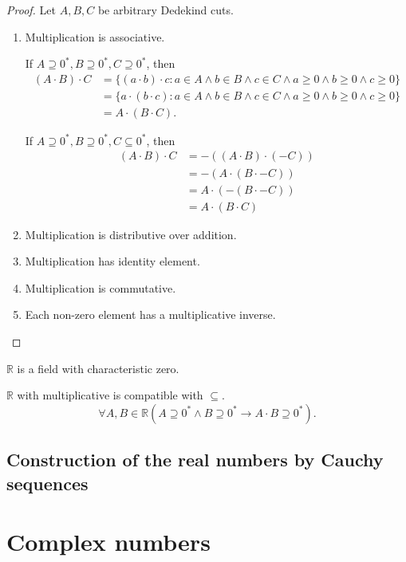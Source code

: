 \begin{proof}
    \par Let $A, B, C$ be arbitrary Dedekind cuts.
    \begin{enumerate}[label={(F\arabic*)}, start=4]
        \item Multiplication is associative.
              \par If $A\supseteq {0}^{*}, B\supseteq {0}^{*}, C\supseteq {0}^{*}$, then
              \begin{align*}
                  (A\cdot B)\cdot C & = \{ (a\cdot b)\cdot c : a\in A\land b\in B\land c\in C\land a\ge 0\land b\ge 0\land c\ge 0 \} \\
                                    & = \{ a\cdot (b\cdot c) : a\in A\land b\in B\land c\in C\land a\ge 0\land b\ge 0\land c\ge 0 \} \\
                                    & = A\cdot (B\cdot C).
              \end{align*}
              \par If $A\supseteq {0}^{*}, B\supseteq {0}^{*}, C\subseteq {0}^{*}$, then
              \begin{align*}
                  (A\cdot B)\cdot C & = -\left( (A\cdot B)\cdot (-C) \right) \\
                                    & = -(A\cdot (B\cdot -C))                \\
                                    & = A\cdot (-(B\cdot -C))                \\
                                    & = A\cdot (B\cdot C)
              \end{align*}
        \item Multiplication is distributive over addition.
        \item Multiplication has identity element.
        \item Multiplication is commutative.
        \item Each non-zero element has a multiplicative inverse.
    \end{enumerate}
\end{proof}

\begin{theorem}
    $\mathbb{R}$ is a field with characteristic zero.
\end{theorem}

\begin{theorem}
    $\mathbb{R}$ with multiplicative is compatible with $\subseteq$.
    \[
        \forall A, B\in\mathbb{R}(A\supseteq {0}^{*}\land B\supseteq {0}^{*}\rightarrow A\cdot B\supseteq {0}^{*}).
    \]
\end{theorem}

\subsection{Construction of the real numbers by Cauchy sequences}

\section{Complex numbers}


